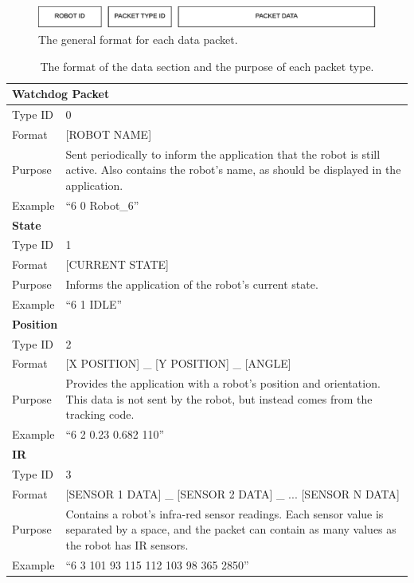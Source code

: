 \begin{figure}[h]
 \centering
 \includegraphics[scale=0.3]{Figures/DataFormat.png}
 \decoRule
 \caption[Data Format]{The general format for each data packet.}
 \label{fig:DataFormat}
\end{figure}

\clearpage
\begin{longtable}{ l p{12cm} }
\caption[Data Format]{The format of the data section and the purpose of each packet type.}\\
 \hline
 \multicolumn{2}{p{12cm}}{\textbf{Watchdog Packet}}\\
 \hline
 Type ID & 0 \\
 Format & [ROBOT NAME]\\
 Purpose & Sent periodically to inform the application that the robot is still active. Also contains the robot's name, as should be displayed in the application.\\
 Example & ``6 0 Robot\_6''\\
 
 \hline
 \multicolumn{2}{p{12cm}}{\textbf{State}}\\
 \hline
 Type ID & 1 \\
 Format & [CURRENT STATE]\\
 Purpose & Informs the application of the robot's current state.\\
 Example & ``6 1 IDLE''\\
 
 \hline
 \multicolumn{2}{p{12cm}}{\textbf{Position}}\\
 \hline
 Type ID & 2 \\
 Format & [X POSITION] \_ [Y POSITION] \_ [ANGLE]\\
 Purpose & Provides the application with a robot's position and orientation. This data is not sent by the robot, but instead comes from the tracking code.\\
 Example & ``6 2 0.23 0.682 110''\\
 
 \hline
 \multicolumn{2}{p{12cm}}{\textbf{IR}}\\
 \hline
 Type ID & 3 \\
 Format & [SENSOR 1 DATA] \_ [SENSOR 2 DATA] \_ ... [SENSOR N DATA] \\
 Purpose & Contains a robot's infra-red sensor readings. Each sensor value is separated by a space, and the packet can contain as many values as the robot has IR sensors. \\
 Example & ``6 3 101 93 115 112 103 98 365 2850''\\
 

\end{longtable}
